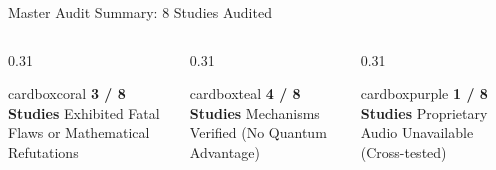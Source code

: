 \documentclass[aspectratio=169, 10pt]{beamer}
\newcommand{\statbox}[3]{%
  \begin{beamercolorbox}[wd=\linewidth,rounded=true,center,sep=3pt]{#1}%
    {\Large\bfseries #2}\vskip 1pt%
    {\scriptsize #3}%
  \end{beamercolorbox}%
}
\begin{document}
\begin{frame}{Master Audit Summary: 8 Studies Audited}
  \vspace*{4pt}
  \begin{columns}[T]
    \begin{column}{0.31\textwidth}
      \statbox{cardboxcoral}{\color{CoralRed} 3 / 8 Studies}{Exhibited Fatal Flaws or Mathematical Refutations}
    \end{column}
    \begin{column}{0.31\textwidth}
      \statbox{cardboxteal}{\color{TealAccent} 4 / 8 Studies}{Mechanisms Verified (No Quantum Advantage)}
    \end{column}
    \begin{column}{0.31\textwidth}
      \statbox{cardboxpurple}{\color{DeepPurple} 1 / 8 Studies}{Proprietary Audio Unavailable (Cross-tested)}
    \end{column}
  \end{columns}
\end{frame}
\end{document}
